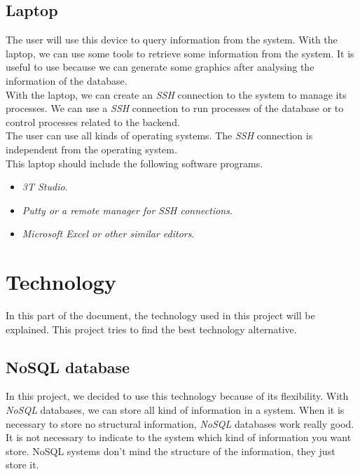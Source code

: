 \subsection{Laptop}

The user will use this device to query information from the system. With the laptop, we can use some tools to retrieve some information from the system. It is useful to use because we can generate some graphics after analysing the information of the database.\\

With the laptop, we can create an \textit{SSH} connection to the system to manage its processes. We can use a \textit{SSH} connection to run processes of the database or to control processes related to the backend.\\

The user can use all kinds of operating systems. The \textit{SSH} connection is independent from the operating system. \\

This laptop should include the following software programs.

\begin{itemize}

\item \textit{3T Studio}.

\item \textit{Putty or a remote manager for SSH connections}.

\item \textit{Microsoft Excel or other similar editors}.

\end{itemize}

\section{Technology}

In this part of the document, the technology used in this project will be explained. This project tries to find the best technology alternative.

\subsection{NoSQL database}

In this project, we decided to use this technology because of its flexibility. With \textit{NoSQL} databases, we can store all kind of information in a system. When it is necessary to store no structural information, \textit{NoSQL} databases work really good. It is not necessary to indicate to the system which kind of information you want store. NoSQL systems don't mind the structure of the information, they just store it.\\


